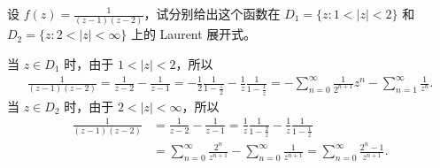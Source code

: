 \documentclass[../../main.tex]{subfiles}%
\begin{document}
\begin{example}
设 \( f(z) = \frac{1}{(z - 1)(z - 2)} \)，试分别给出这个函数在 \( D_1 = \{ z: 1 < |z| < 2 \} \) 和 \( D_2 = \{ z: 2 < |z| < \infty \} \) 上的 Laurent 展开式。
\end{example}
\begin{solution}

当 \( z \in D_1 \) 时，由于 \( 1 < |z| < 2 \)，所以
\begin{align*}
\frac{1}{(z - 1)(z - 2)} = \frac{1}{z - 2} - \frac{1}{z - 1} = -\frac{1}{2} \frac{1}{1 - \frac{z}{2}} - \frac{1}{z} \frac{1}{1 - \frac{1}{z}} = -\sum_{n = 0}^{\infty} \frac{1}{2^{n + 1}} z^n - \sum_{n = 1}^{\infty} \frac{1}{z^n}.
\end{align*}
当 \( z \in D_2 \) 时，由于 \( 2 < |z| < \infty \)，所以
\begin{align*}
\frac{1}{(z - 1)(z - 2)} &= \frac{1}{z - 2} - \frac{1}{z - 1} = \frac{1}{z} \frac{1}{1 - \frac{2}{z}} - \frac{1}{z} \frac{1}{1 - \frac{1}{z}} \\
&= \sum_{n = 0}^{\infty} \frac{2^n}{z^{n + 1}} - \sum_{n = 0}^{\infty} \frac{1}{z^{n + 1}} = \sum_{n = 0}^{\infty} \frac{2^n - 1}{z^{n + 1}}.
\end{align*}

\end{solution}
\end{document}

